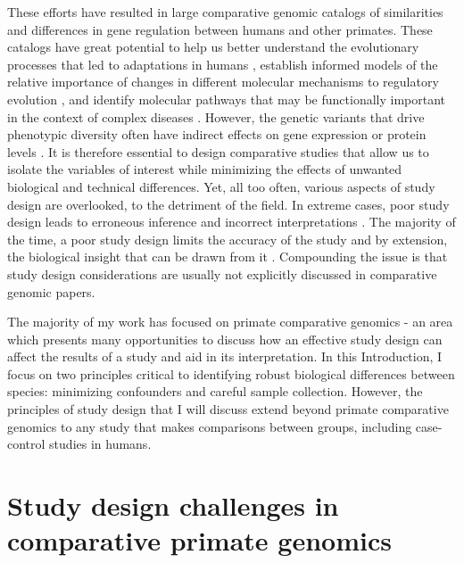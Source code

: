 These efforts have resulted in large comparative genomic catalogs of similarities and differences in gene regulation between humans and other primates. These catalogs have great potential to help us better understand the evolutionary processes that led to adaptations in humans \cite{RN3426, RN1339, RN2106, RN3419, RN519, RN1931, RN3425, RN3422, RN1929, RN3421, RN3435, RN3424, RN1798, RN2091, RN3427}, establish informed models of the relative importance of changes in different molecular mechanisms to regulatory evolution \cite{RN3423, RN3429}, and identify molecular pathways that may be functionally important in the context of complex diseases \cite{RN1339, RN2106}. However, the genetic variants that drive phenotypic diversity often have indirect effects on gene expression or protein levels \cite{RN1343}. It is therefore essential to design comparative studies that allow us to isolate the variables of interest while minimizing the effects of unwanted biological and technical differences. Yet, all too often, various aspects of study design are overlooked, to the detriment of the field. In extreme cases, poor study design leads to erroneous inference and incorrect interpretations \cite{RN3432, RN1402}. The majority of the time, a poor study design limits the accuracy of the study and by extension, the biological insight that can be drawn from it \cite{RN1339, RN3285, RN3434}. Compounding the issue is that study design considerations are usually not explicitly discussed in comparative genomic papers. 

The majority of my work has focused on primate comparative genomics - an area which presents many opportunities to discuss how an effective study design can affect the results of a study and aid in its interpretation. In this Introduction, I focus on two principles critical to identifying robust biological differences between species: minimizing confounders and careful sample collection. However, the principles of study design that I will discuss extend beyond primate comparative genomics to any study that makes comparisons between groups, including case-control studies in humans.

\section{Study design challenges in comparative primate genomics}

